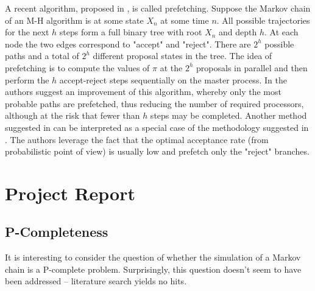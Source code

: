 \documentclass[11pt,letterpaper]{article}       %
\begin{document}
A recent algorithm, proposed in \cite{brockwell2006parallel}, is called 
prefetching.  Suppose the Markov chain of an M-H algorithm is at some state
$X_n$ at some time $n$.  All possible trajectories for the next $h$ steps 
form a full binary tree with root $X_n$ and depth $h$.  At each node 
the two edges correspond to "accept" and "reject".  
There are $2^h$ possible paths and a total of $2^h$ different 
proposal states in the tree.  The idea of prefetching is to compute the values of $\pi$
at the $2^h$ proposals in parallel and then perform the $h$ accept-reject 
steps sequentially on the master process.  In \cite{strid2010efficient} 
the authors suggest an improvement of this algorithm, whereby only the most probable 
paths are prefetched, thus reducing the number of required processors, although at
the risk that fewer than $h$ steps may be completed.  Another method suggested in 
\cite{byrd2008reducing} can be interpreted as a special case of the methodology 
suggested in \cite{strid2010efficient}.  The authors leverage the fact that the optimal 
acceptance rate (from probabilistic point of view) is usually low and prefetch 
only the "reject" branches.

\section{Project Report} \label{projrep}

\subsection{P-Completeness} \label{subsect-PComp}

It is interesting to consider the question of whether the simulation of a
Markov chain is a P-complete problem.  Surprisingly, this question doesn't seem
to have been addressed -- literature search yields no hits.
\end{document}
